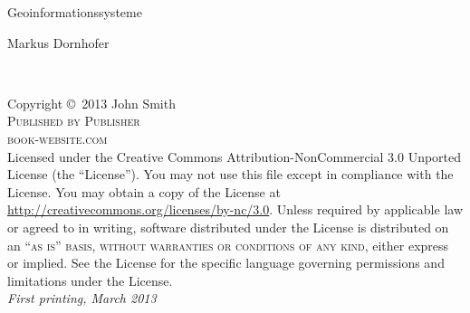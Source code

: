 \documentclass[11pt,fleqn]{book} %
\begin{document}

\begingroup
\thispagestyle{empty}
\centering
\vspace*{9cm}
\par\normalfont\fontsize{35}{35}\sffamily\selectfont
Geoinformationssysteme\par %
\vspace*{1cm}
{\Huge Markus Dornhofer}\par %
\endgroup


\newpage
~\vfill
\thispagestyle{empty}


\noindent Copyright \copyright\ 2013 John Smith\\ %

\noindent \textsc{Published by Publisher}\\ %

\noindent \textsc{book-website.com}\\ %

\noindent Licensed under the Creative Commons Attribution-NonCommercial 3.0 Unported License (the ``License''). You may not use this file except in compliance with the License. You may obtain a copy of the License at \url{http://creativecommons.org/licenses/by-nc/3.0}. Unless required by applicable law or agreed to in writing, software distributed under the License is distributed on an \textsc{``as is'' basis, without warranties or conditions of any kind}, either express or implied. See the License for the specific language governing permissions and limitations under the License.\\ %

\noindent \textit{First printing, March 2013} %


\end{document}
